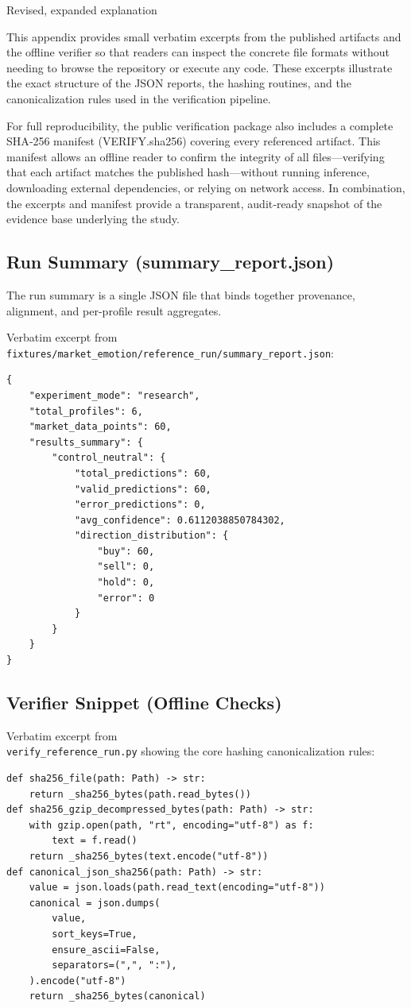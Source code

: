 \documentclass[12pt,a4paper]{report}
\begin{document}
Revised, expanded explanation

This appendix provides small verbatim excerpts from the published artifacts and the offline verifier so that readers can inspect the concrete file formats without needing to browse the repository or execute any code. These excerpts illustrate the exact structure of the JSON reports, the hashing routines, and the canonicalization rules used in the verification pipeline.

For full reproducibility, the public verification package also includes a complete SHA‑256 manifest (VERIFY.sha256) covering every referenced artifact. This manifest allows an offline reader to confirm the integrity of all files—verifying that each artifact matches the published hash—without running inference, downloading external dependencies, or relying on network access. In combination, the excerpts and manifest provide a transparent, audit‑ready snapshot of the evidence base underlying the study.

\subsection{Run Summary (summary\_report.json)}

The run summary is a single JSON file that binds together provenance, alignment, and per-profile result aggregates.

Verbatim excerpt from \texttt{fixtures/market\_emotion/reference\_run/summary\_report.json}:

\begin{Verbatim}[fontsize=\small,breaklines=true,breakanywhere=true]
{
	"experiment_mode": "research",
	"total_profiles": 6,
	"market_data_points": 60,
	"results_summary": {
		"control_neutral": {
			"total_predictions": 60,
			"valid_predictions": 60,
			"error_predictions": 0,
			"avg_confidence": 0.6112038850784302,
			"direction_distribution": {
				"buy": 60,
				"sell": 0,
				"hold": 0,
				"error": 0
			}
		}
	}
}
\end{Verbatim}

\subsection{Verifier Snippet (Offline Checks)}

Verbatim excerpt from \\ \texttt{verify\_reference\_run.py} showing the core hashing canonicalization rules:

\begin{Verbatim}[fontsize=\small,breaklines=true,breakanywhere=true]
def sha256_file(path: Path) -> str:
	return _sha256_bytes(path.read_bytes())
def sha256_gzip_decompressed_bytes(path: Path) -> str:
	with gzip.open(path, "rt", encoding="utf-8") as f:
		text = f.read()
	return _sha256_bytes(text.encode("utf-8"))
def canonical_json_sha256(path: Path) -> str:
	value = json.loads(path.read_text(encoding="utf-8"))
	canonical = json.dumps(
		value,
		sort_keys=True,
		ensure_ascii=False,
		separators=(",", ":"),
	).encode("utf-8")
	return _sha256_bytes(canonical)
\end{Verbatim}



\end{document}
